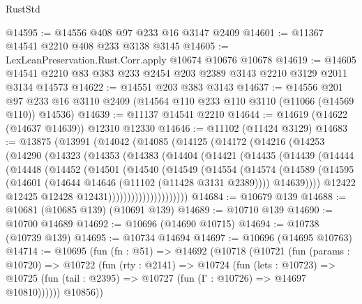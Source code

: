 \begin{lexlean}{RustStd}
\begin{coremodule}
@14595 := @14556 @408 @97 @233 @16 @3147 @2409
@14601 := @11367 @14541 @2210 @408 @233 @3138 @3145
@14605 := LexLeanPreservation.Rust.Corr.apply @10674 @10676 @10678
@14619 := @14605 @14541 @2210 @83 @383 @233 @2454 @203 @2389 @3143 @2210 @3129 @2011 @3134 @14573
@14622 := @14551 @203 @383 @3143
@14637 := @14556
    @201
    @97
    @233
    @16
    @3110
    @2409
    (@14564 @110 @233 @110 @3110 (@11066 (@14569 @110)) @14536)
@14639 := @11137 @14541 @2210
@14644 := @14619 (@14622 (@14637 @14639)) @12310 @12330
@14646 := @11102 (@11424 @3129)
@14683 := @13875
    (@13991
      (@14042
        (@14085
          (@14125
            (@14172
              (@14216
                (@14253
                  (@14290
                    (@14323
                      (@14353
                        (@14383
                          (@14404
                            (@14421
                              (@14435
                                (@14439
                                  (@14444
                                    (@14448
                                      (@14452
                                        (@14501
                                          (@14540
                                            (@14549
                                              (@14554
                                                (@14574
                                                  (@14589
                                                    (@14595
                                                      (@14601
                                                        (@14644
                                                          @14646
                                                          (@11102 (@11428 @3131 @2389))))
                                                      @14639))))
                                              @12422
                                              @12425
                                              @12428
                                              @12431)))))))))))))))))))))
@14684 := @10679 @139
@14688 := @10681 (@10685 @139) (@10691 @139)
@14689 := @10710 @139
@14690 := @10700 @14689
@14692 := @10696 (@14690 @10715)
@14694 := @10738 (@10739 @139)
@14695 := @10734 @14694
@14697 := @10696 (@14695 @10763)
@14714 := @10695
    (fun (fn : @51) =>
    @14692
      (@10718
        (@10721
          (fun (params : @10720) =>
          @10722
            (fun (rty : @2141) =>
            @10724
              (fun (lets : @10723) =>
              @10725 (fun (tail : @2395) => @10727 (fun (Γ : @10726) => @14697 @10810))))))
        @10856))

\end{coremodule}
\end{lexlean}
